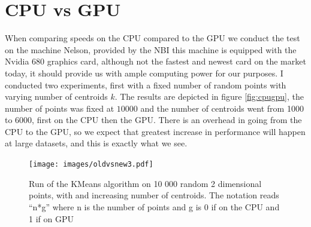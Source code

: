 \documentclass[12pt]{report}
\begin{document}
\section{CPU vs GPU}
\label{sec:cpugpu}
When comparing speeds on the CPU compared to the GPU we conduct the test on the machine Nelson, provided by the NBI this machine is equipped with the Nvidia 680 graphics card, although not the fastest and newest card on the market today, it should provide us with ample computing power for our purposes. I conducted two experiments, first with a fixed number of random points with varying number of centroids $k$. The results are depicted in figure \ref{fig:cpugpu}, the number of points was fixed at $10 000$ and the number of centroids went from 1000 to 6000, first on the CPU then the GPU. There is an overhead in going from the CPU to the GPU, so we expect that greatest increase in performance will happen at large datasets, and this is exactly what we see.


\begin{figure}[ht]
  \centering
  \texttt{[image: images/oldvsnew3.pdf]}
  \caption{\label{fig:label} Run of the KMeans algorithm on 10 000 random 2 dimensional points, with and increasing number of centroids. The notation reads ``n*g'' where n is the number of points and g is 0 if on the CPU and 1 if on GPU}
\end{figure}






\end{document}
